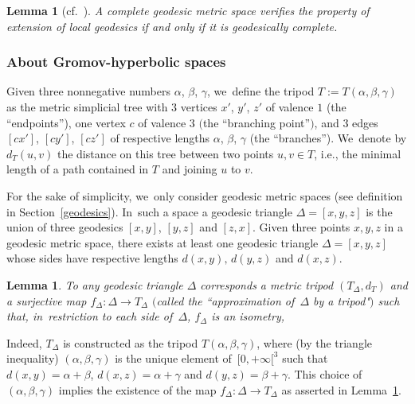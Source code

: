 \documentclass[pdftex]{sigma}
\numberwithin{equation}{section}
\newtheorem{Lemma}[theor]{Lemma}
\newcommand{\f}{\rightarrow}
\begin{document}
\begin{Lemma}[{cf.~\cite[Lemma~II.5.8(1), p.~208]{BH}}]%
A \emph{complete} geodesic metric space verifies the property of extension of local geodesics if and only if it is geodesically complete.
\end{Lemma}

\subsubsection{About Gromov-hyperbolic spaces}%

Given three nonnegative numbers $\alpha$, $\beta$, $\gamma$, we~define
the tripod $T := T(\alpha, \beta, \gamma)$ as the metric simplicial tree
with $3$ vertices
$x'$, $y'$, $z'$ of valence $1$ (the ``endpoints''), one vertex $c$
of valence $3$ $($the ``branching point''$)$, and $3$ edges $[cx']$,
$[cy']$, $[cz']$
of respective lengths $\alpha$, $\beta$, $\gamma$ (the ``branches''). We~denote by $d_T (u,v) $ the distance on this tree between two points $u,v \in
T$, i.e., the minimal length of a path contained in $T$ and joining $u$ to
$v$.

\medskip

For the sake of simplicity, we~only consider geodesic metric spaces (see definition in Section~\ref{geodesics}). In~such a space a geodesic triangle
$\Delta = [x, y, z]$ is the union of three geodesics $[x, y ]$, $[y, z ]$ and $[z, x ]$. Given three points $x,y,z$ in a geodesic metric space, there
exists at least one geodesic triangle $\Delta = [x, y, z]$ whose sides have respective lengths $d(x,y),\, d(y,z)$ and $d(x,z)$.

\begin{Lemma}\label{prodist}
To any geodesic triangle $\Delta$ corresponds a metric tripod $(T_\Delta, d_T)$ and a surjective map $f_\Delta \colon \Delta \f T_\Delta$ $($called the
``approximation of~$\Delta$ by a tripod"$)$ such that, in~restriction
to each side of~$\Delta$, $f_\Delta$ is an isometry,
\end{Lemma}

Indeed, $T_\Delta$ is constructed as the tripod $ T(\alpha, \beta, \gamma)$, where (by the triangle inequality) $(\alpha, \beta, \gamma)$ is the
unique element of~$[0, +\infty[^3$ such that $d(x, y) = \alpha + \beta$, $d(x, z) = \alpha + \gamma$ and $d(y, z) = \beta + \gamma$. This choice of~$(\alpha, \beta, \gamma)$ implies the existence of the map $f_\Delta \colon \Delta \f T_\Delta$ as asserted in Lemma~\ref{prodist}.
\end{document}
